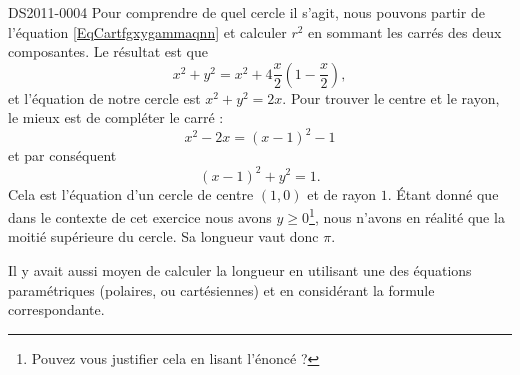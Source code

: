 \begin{corrige}{DS2011-0004}
    Pour comprendre de quel cercle il s'agit, nous pouvons partir de l'équation \eqref{EqCartfgxygammaqnn} et calculer \( r^2\) en sommant les carrés des deux composantes. Le résultat est que
    \begin{equation}
        x^2+y^2=x^2+4\frac{ x }{2}\left( 1-\frac{ x }{2} \right),
    \end{equation}
    et l'équation de notre cercle est \( x^2+y^2=2x\). Pour trouver le centre et le rayon, le mieux est de compléter le carré :
    \begin{equation}
        x^2-2x=(x-1)^2-1
    \end{equation}
    et par conséquent
    \begin{equation}
        (x-1)^2+y^2=1.
    \end{equation}
    Cela est l'équation d'un cercle de centre \( (1,0)\) et de rayon \( 1\). Étant donné que dans le contexte de cet exercice nous avons \( y\geq 0\)\footnote{Pouvez vous justifier cela en lisant l'énoncé ?}, nous n'avons en réalité que la moitié supérieure du cercle. Sa longueur vaut donc \( \pi\).

    Il y avait aussi moyen de calculer la longueur en utilisant une des équations paramétriques (polaires, ou cartésiennes) et en considérant la formule correspondante.

\end{corrige}
